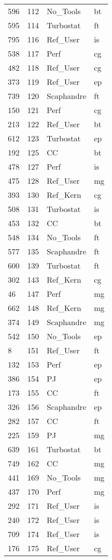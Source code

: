 \begin{tabular}{lrll}
596 & 112 & No_Tools & bt \\
595 & 114 & Turbostat & ft \\
795 & 116 & Ref_User & is \\
538 & 117 & Perf & cg \\
482 & 118 & Ref_User & cg \\
373 & 119 & Ref_User & ep \\
739 & 120 & Scaphandre & ft \\
150 & 121 & Perf & cg \\
213 & 122 & Ref_User & bt \\
612 & 123 & Turbostat & ep \\
192 & 125 & CC & bt \\
478 & 127 & Perf & is \\
475 & 128 & Ref_User & mg \\
393 & 130 & Ref_Kern & cg \\
508 & 131 & Turbostat & is \\
453 & 132 & CC & bt \\
548 & 134 & No_Tools & ft \\
577 & 135 & Scaphandre & ft \\
600 & 139 & Turbostat & ft \\
302 & 143 & Ref_Kern & cg \\
46 & 147 & Perf & mg \\
662 & 148 & Ref_Kern & mg \\
374 & 149 & Scaphandre & mg \\
542 & 150 & No_Tools & ep \\
8 & 151 & Ref_User & ft \\
132 & 153 & Perf & ep \\
386 & 154 & PJ & ep \\
173 & 155 & CC & ft \\
326 & 156 & Scaphandre & ep \\
282 & 157 & CC & ft \\
225 & 159 & PJ & mg \\
639 & 161 & Turbostat & bt \\
749 & 162 & CC & mg \\
441 & 169 & No_Tools & mg \\
437 & 170 & Perf & mg \\
292 & 171 & Ref_User & is \\
240 & 172 & Ref_User & is \\
709 & 174 & Ref_User & is \\
176 & 175 & Ref_User & cg \\

\end{tabular}
